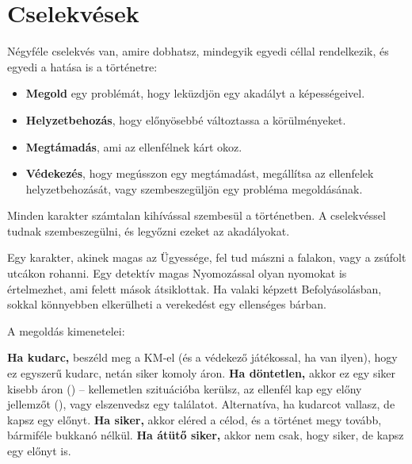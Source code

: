 \section{Cselekvések}

Négyféle cselekvés van, amire dobhatsz, mindegyik egyedi céllal rendelkezik, és egyedi a hatása is a történetre:

\begin{itemize}
    \item \textbf{Megold} egy problémát, hogy leküzdjön egy akadályt a képességeivel.
    \item \textbf{Helyzetbehozás}, hogy előnyösebbé változtassa a körülményeket.
    \item \textbf{Megtámadás}, ami az ellenfélnek kárt okoz.
    \item \textbf{Védekezés}, hogy megússzon egy megtámadást, megállítsa az ellenfelek helyzetbehozását, vagy szembeszegüljön egy probléma megoldásának.
\end{itemize}


Minden karakter számtalan kihívással szembesül a történetben. A  cselekvéssel tudnak szembeszegülni, és legyőzni ezeket az akadályokat.

Egy karakter, akinek magas az Ügyessége, fel tud mászni a falakon, vagy a zsúfolt utcákon rohanni. Egy detektív magas Nyomozással olyan nyomokat is értelmezhet, ami felett mások átsiklottak. Ha valaki képzett Befolyásolásban, sokkal könnyebben elkerülheti a verekedést egy ellenséges bárban.

A megoldás kimenetelei:

\begin{itemize}
    \failureitem \textbf{Ha kudarc,} beszéld meg a KM‑el (és a védekező játékossal, ha van ilyen), hogy ez egyszerű kudarc, netán siker komoly áron.
    \tieitem \textbf{Ha döntetlen,} akkor ez egy siker kisebb áron () – kellemetlen szituációba kerülsz, az ellenfél kap egy előny jellemzőt (), vagy elszenvedsz egy találatot. Alternatíva, ha kudarcot vallasz, de kapsz egy előnyt.
    \successitem \textbf{Ha siker,} akkor eléred a célod, és a történet megy tovább, bármiféle bukkanó nélkül.
    \successwithstyleitem \textbf{Ha átütő siker,} akkor nem csak, hogy siker, de kapsz egy előnyt is.
\end{itemize}


